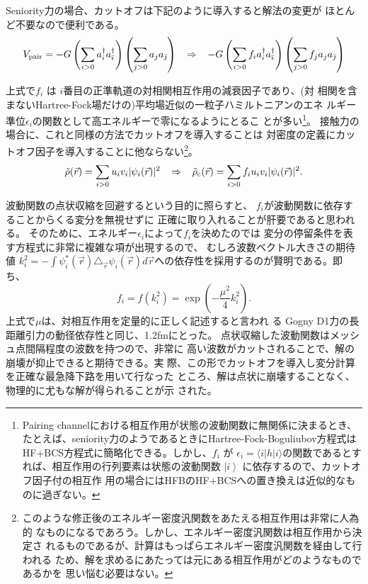 
Seniority力の場合、カットオフは下記のように導入すると解法の変更が
ほとんど不要なので便利である。
%
\begin{equation}
V_{\rm pair} = -G 
\left(\sum_{i >0} a^{\dagger}_{i} a^{\dagger}_{\bar{\imath}} \right)
\left(\sum_{j >0} a_{j} a_{\bar{\jmath}} \right)
\;\;\; \Rightarrow \;\;\;
-G 
\left(\sum_{i >0} f_i a^{\dagger}_{i} a^{\dagger}_{\bar{\imath}} \right)
\left(\sum_{j >0} f_j a_{j} a_{\bar{\jmath}} \right)
\end{equation}
%

上式で$f_i$ は $i$番目の正準軌道の対相関相互作用の減衰因子であり、(対
相関を含まないHartree-Fock場だけの)平均場近似の一粒子ハミルトニアンのエネ
ルギー準位$\epsilon_i$の関数として高エネルギーで零になるようにとるこ
とが多い\footnote{
%
Pairing channelにおける相互作用が状態の波動関数に無関係に決まるとき、
たとえば、seniority力のようであるときにHartree-Fock-Boguliubov方程式は
HF+BCS方程式に簡略化できる。しかし、$f_i$ が $\epsilon_i = \langle i |
h | i \rangle$の関数であるとすれば、相互作用の行列要素は状態の波動関数
$\left\vert i \right\rangle$ に依存するので、カットオフ因子付の相互作
用の場合にはHFBのHF+BCSへの置き換えは近似的なものに過ぎない。
%
}。
%
接触力の場合に、これと同様の方法でカットオフを導入することは
対密度の定義にカットオフ因子を導入することに他ならない\footnote{
%
このような修正後のエネルギー密度汎関数をあたえる相互作用は非常に人為的
なものになるであろう。しかし、エネルギー密度汎関数は相互作用から決定さ
れるものであるが、計算はもっぱらエネルギー密度汎関数を経由して行われる
ため、解を求めるにあたっては元にある相互作用がどのようなものであるかを
思い悩む必要はない。
%
}。
%
\begin{equation}
\tilde{\rho}(\vec{r}) = \sum_{i>0} u_i v_i |\psi_i (\vec{r})|^2
\;\;\; \Rightarrow \;\;\;
\tilde{\rho}_{\rm c}(\vec{r}) = \sum_{i>0} f_i u_i v_i |\psi_i (\vec{r})|^2.
\end{equation}
%

波動関数の点状収縮を回避するという目的に照らすと、
$f_i$が波動関数に依存することからくる変分を無視せずに
正確に取り入れることが肝要であると思われる。
そのために、エネルギー$\epsilon_i$によって$f_i$を決めたのでは
変分の停留条件を表す方程式に非常に複雑な項が出現するので、
むしろ波数ベクトル大きさの期待値 $k_i^2 =
- \int \psi_{i}^{\ast} (\vec{r}) \triangle_{\vec{r}} \psi_i (\vec{r}) 
d \vec{r}$への依存性を採用するのが賢明である。即ち、
%
\begin{equation}
f_i = f (k_i^2) = \exp \left( -\frac{\mu^2}{4}k_i^2 \right).
\end{equation}
%
上式で$\mu$は、対相互作用を定量的に正しく記述すると言われ
る Gogny D1力\cite{DG80}の長距離引力の動径依存性と同じ、1.2fmにとった。
点状収縮した波動関数はメッシュ点間隔程度の波数を持つので、非常に
高い波数がカットされることで、解の崩壊が抑止できると期待できる。実
際、この形でカットオフを導入し変分計算を正確な最急降下路を用いて行なった
ところ、解は点状に崩壊することなく、物理的に尤もな解が得られることが示
された。

